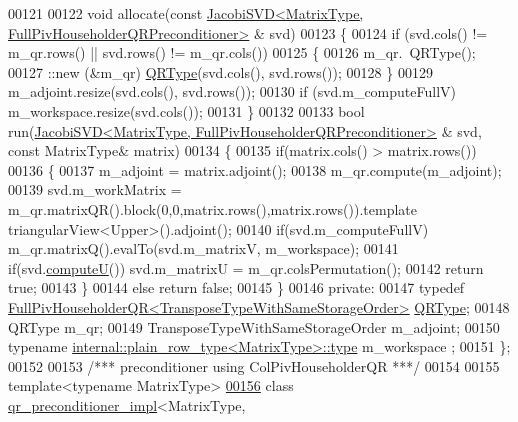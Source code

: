 \begin{DoxyCode}
00121 
00122   \textcolor{keywordtype}{void} allocate(\textcolor{keyword}{const} \hyperlink{group___s_v_d___module_class_eigen_1_1_jacobi_s_v_d}{JacobiSVD<MatrixType, FullPivHouseholderQRPreconditioner>}
      & svd)
00123   \{
00124     \textcolor{keywordflow}{if} (svd.cols() != m\_qr.rows() || svd.rows() != m\_qr.cols())
00125     \{
00126       m\_qr.~QRType();
00127       ::new (&m\_qr) \hyperlink{group___q_r___module}{QRType}(svd.cols(), svd.rows());
00128     \}
00129     m\_adjoint.resize(svd.cols(), svd.rows());
00130     \textcolor{keywordflow}{if} (svd.m\_computeFullV) m\_workspace.resize(svd.cols());
00131   \}
00132 
00133   \textcolor{keywordtype}{bool} run(\hyperlink{group___s_v_d___module_class_eigen_1_1_jacobi_s_v_d}{JacobiSVD<MatrixType, FullPivHouseholderQRPreconditioner>}
      & svd, \textcolor{keyword}{const} MatrixType& matrix)
00134   \{
00135     \textcolor{keywordflow}{if}(matrix.cols() > matrix.rows())
00136     \{
00137       m\_adjoint = matrix.adjoint();
00138       m\_qr.compute(m\_adjoint);
00139       svd.m\_workMatrix = m\_qr.matrixQR().block(0,0,matrix.rows(),matrix.rows()).\textcolor{keyword}{template} 
      triangularView<Upper>().adjoint();
00140       \textcolor{keywordflow}{if}(svd.m\_computeFullV) m\_qr.matrixQ().evalTo(svd.m\_matrixV, m\_workspace);
00141       \textcolor{keywordflow}{if}(svd.\hyperlink{group___s_v_d___module_a705a7c2709e1624ccc19aa748a78d473}{computeU}()) svd.m\_matrixU = m\_qr.colsPermutation();
00142       \textcolor{keywordflow}{return} \textcolor{keyword}{true};
00143     \}
00144     \textcolor{keywordflow}{else} \textcolor{keywordflow}{return} \textcolor{keyword}{false};
00145   \}
00146 \textcolor{keyword}{private}:
00147   \textcolor{keyword}{typedef} \hyperlink{group___q_r___module}{FullPivHouseholderQR<TransposeTypeWithSameStorageOrder>}
       \hyperlink{group___q_r___module}{QRType};
00148   QRType m\_qr;
00149   TransposeTypeWithSameStorageOrder m\_adjoint;
00150   \textcolor{keyword}{typename} \hyperlink{class_eigen_1_1internal_1_1_tensor_lazy_evaluator_writable}{internal::plain\_row\_type<MatrixType>::type} m\_workspace
      ;
00151 \};
00152 
00153 \textcolor{comment}{/*** preconditioner using ColPivHouseholderQR ***/}
00154 
00155 \textcolor{keyword}{template}<\textcolor{keyword}{typename} MatrixType>
\hyperlink{class_eigen_1_1internal_1_1qr__preconditioner__impl_3_01_matrix_type_00_01_col_piv_householder_q4429b16903ed71549d5aafc43959c2c2}{00156} \textcolor{keyword}{class }\hyperlink{struct_eigen_1_1internal_1_1qr__preconditioner__impl}{qr\_preconditioner\_impl}<MatrixType, 

\end{DoxyCode}
